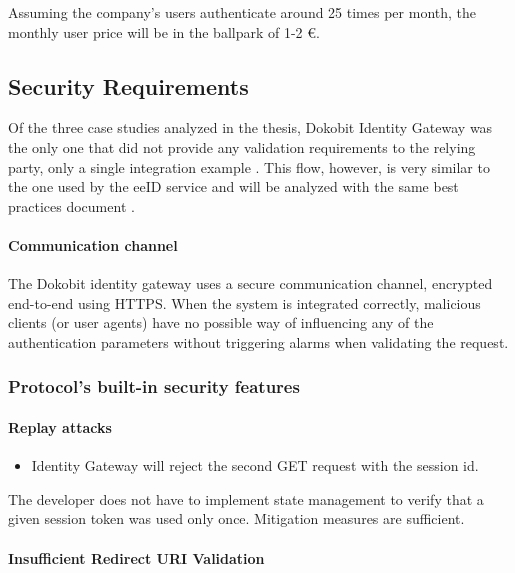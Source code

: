 Assuming the company's users authenticate around 25 times per month, the monthly user price will be in the ballpark of 1-2 €.

\subsection{Security Requirements}

Of the three case studies analyzed in the thesis, Dokobit Identity Gateway was the only one that did not provide any validation requirements to the relying party, only a single integration example \cite{dokobit-idgw-docs}. This flow, however, is very similar to the one used by the eeID service and will be analyzed with the same best practices document \cite{ietf-oauth-security-topics-19}.

\paragraph{Communication channel}

The Dokobit identity gateway uses a secure communication channel, encrypted end-to-end using HTTPS. When the system is integrated correctly, malicious clients (or user agents) have no possible way of influencing any of the authentication parameters without triggering alarms when validating the request.

\subsubsection{Protocol's built-in security features}

\paragraph{Replay attacks}

\begin{itemize}
  \item Identity Gateway will reject the second GET request with the session id.
\end{itemize}

The developer does not have to implement state management to verify that a given session token was used only once. Mitigation measures are sufficient.

\paragraph{Insufficient Redirect URI Validation}

